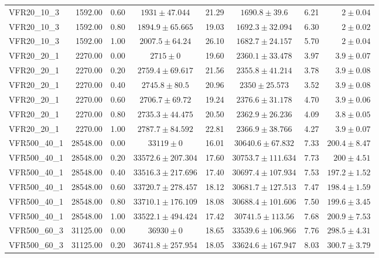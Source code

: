 \begin{longtable}{lrrccccr}
  VFR20\_10\_3 & 1592.00 & 0.60 & $1931 \pm 47.044$ & 21.29 & $1690.8 \pm 39.6$ & 6.21 & $2 \pm 0.04$ \\ 
  VFR20\_10\_3 & 1592.00 & 0.80 & $1894.9 \pm 65.665$ & 19.03 & $1692.3 \pm 32.094$ & 6.30 & $2 \pm 0.02$ \\ 
  VFR20\_10\_3 & 1592.00 & 1.00 & $2007.5 \pm 64.24$ & 26.10 & $1682.7 \pm 24.157$ & 5.70 & $2 \pm 0.04$ \\ 
   \midrule
VFR20\_20\_1 & 2270.00 & 0.00 & $2715 \pm 0$ & 19.60 & $2360.1 \pm 33.478$ & 3.97 & $3.9 \pm 0.07$ \\ 
  VFR20\_20\_1 & 2270.00 & 0.20 & $2759.4 \pm 69.617$ & 21.56 & $2355.8 \pm 41.214$ & 3.78 & $3.9 \pm 0.08$ \\ 
  VFR20\_20\_1 & 2270.00 & 0.40 & $2745.8 \pm 80.5$ & 20.96 & $2350 \pm 25.573$ & 3.52 & $3.9 \pm 0.08$ \\ 
  VFR20\_20\_1 & 2270.00 & 0.60 & $2706.7 \pm 69.72$ & 19.24 & $2376.6 \pm 31.178$ & 4.70 & $3.9 \pm 0.06$ \\ 
  VFR20\_20\_1 & 2270.00 & 0.80 & $2735.3 \pm 44.475$ & 20.50 & $2362.9 \pm 26.236$ & 4.09 & $3.8 \pm 0.05$ \\ 
  VFR20\_20\_1 & 2270.00 & 1.00 & $2787.7 \pm 84.592$ & 22.81 & $2366.9 \pm 38.766$ & 4.27 & $3.9 \pm 0.07$ \\ 
   \midrule
VFR500\_40\_1 & 28548.00 & 0.00 & $33119 \pm 0$ & 16.01 & $30640.6 \pm 67.832$ & 7.33 & $200.4 \pm 8.47$ \\ 
  VFR500\_40\_1 & 28548.00 & 0.20 & $33572.6 \pm 207.304$ & 17.60 & $30753.7 \pm 111.634$ & 7.73 & $200 \pm 4.51$ \\ 
  VFR500\_40\_1 & 28548.00 & 0.40 & $33516.3 \pm 217.696$ & 17.40 & $30697.4 \pm 107.934$ & 7.53 & $197.2 \pm 1.52$ \\ 
  VFR500\_40\_1 & 28548.00 & 0.60 & $33720.7 \pm 278.457$ & 18.12 & $30681.7 \pm 127.513$ & 7.47 & $198.4 \pm 1.59$ \\ 
  VFR500\_40\_1 & 28548.00 & 0.80 & $33710.1 \pm 176.109$ & 18.08 & $30688.4 \pm 101.606$ & 7.50 & $199.6 \pm 3.45$ \\ 
  VFR500\_40\_1 & 28548.00 & 1.00 & $33522.1 \pm 494.424$ & 17.42 & $30741.5 \pm 113.56$ & 7.68 & $200.9 \pm 7.53$ \\ 
   \midrule
VFR500\_60\_3 & 31125.00 & 0.00 & $36930 \pm 0$ & 18.65 & $33539.6 \pm 106.966$ & 7.76 & $298.5 \pm 4.31$ \\ 
  VFR500\_60\_3 & 31125.00 & 0.20 & $36741.8 \pm 257.954$ & 18.05 & $33624.6 \pm 167.947$ & 8.03 & $300.7 \pm 3.79$ \\ 

\end{longtable}
